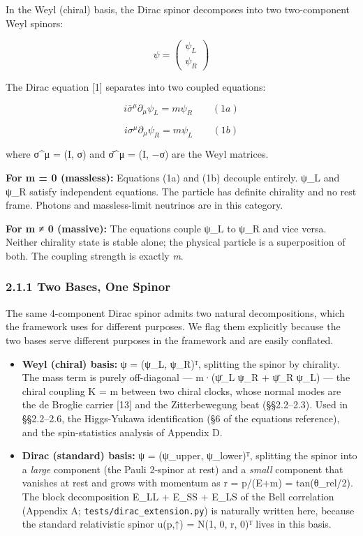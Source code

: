 \documentclass[
]{article}
\begin{document}
In the Weyl (chiral) basis, the Dirac spinor decomposes into two
two-component Weyl spinors:

\[\psi = \begin{pmatrix} \psi_L \\ \psi_R \end{pmatrix}\]

The Dirac equation {[}1{]} separates into two coupled equations:

\[i\bar{\sigma}^\mu \partial_\mu \psi_L = m \psi_R \qquad (1a)\]

\[i\sigma^\mu \partial_\mu \psi_R = m \psi_L \qquad (1b)\]

where σ\^{}μ = (I, σ) and σ̄\^{}μ = (I, −σ) are the Weyl matrices.

\textbf{For m = 0 (massless):} Equations (1a) and (1b) decouple
entirely. ψ\_L and ψ\_R satisfy independent equations. The particle has
definite chirality and no rest frame. Photons and massless-limit
neutrinos are in this category.

\textbf{For m ≠ 0 (massive):} The equations couple ψ\_L to ψ\_R and vice
versa. Neither chirality state is stable alone; the physical particle is
a superposition of both. The coupling strength is exactly \emph{m}.

\subsubsection{2.1.1 Two Bases, One Spinor}\label{two-bases-one-spinor}

The same 4-component Dirac spinor admits two natural decompositions,
which the framework uses for different purposes. We flag them explicitly
because the two bases serve different purposes in the framework and are
easily conflated.

\begin{itemize}
\item
  \textbf{Weyl (chiral) basis:} ψ = (ψ\_L, ψ\_R)ᵀ, splitting the spinor
  by chirality. The mass term is purely off-diagonal --- m·(ψ̄\_L ψ\_R +
  ψ̄\_R ψ\_L) --- the chiral coupling K = m between two chiral clocks,
  whose normal modes are the de Broglie carrier {[}13{]} and the
  Zitterbewegung beat (§§2.2--2.3). Used in §§2.2--2.6, the Higgs-Yukawa
  identification (§6 of the equations reference), and the
  spin-statistics analysis of Appendix D.
\item
  \textbf{Dirac (standard) basis:} ψ = (ψ\_upper, ψ\_lower)ᵀ, splitting
  the spinor into a \emph{large} component (the Pauli 2-spinor at rest)
  and a \emph{small} component that vanishes at rest and grows with
  momentum as r = p/(E+m) = tan(θ\_rel/2). The block decomposition E\_LL
  + E\_SS + E\_LS of the Bell correlation (Appendix A;
  \texttt{tests/dirac\_extension.py}) is naturally written here, because
  the standard relativistic spinor u(p,↑) = N(1, 0, r, 0)ᵀ lives in this
  basis.
\end{itemize}
\end{document}
